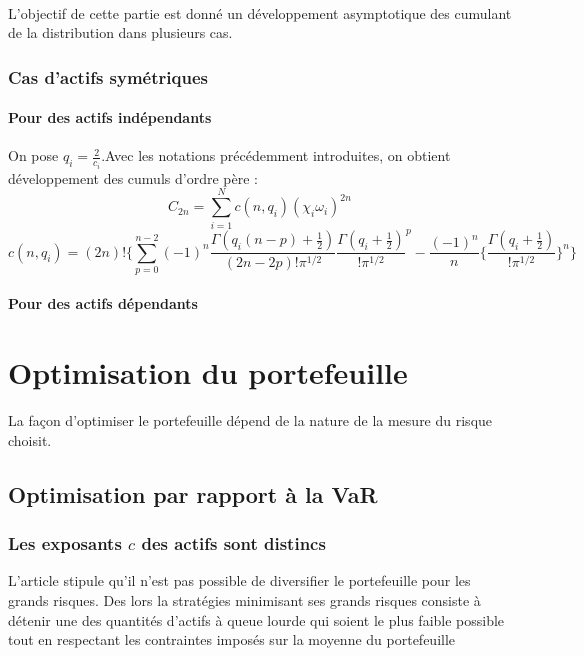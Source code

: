 \documentclass{article}
\begin{document}
     \paragraph{}
     L'objectif de cette partie est donné un développement asymptotique des cumulant de la distribution dans plusieurs cas.
     \subsubsection{Cas d'actifs symétriques}
     \paragraph{Pour des actifs indépendants}
     On pose $ q_{i}=\frac{2}{c_{i}}$.Avec les notations précédemment introduites, on obtient développement des cumuls d'ordre père :
     \begin{equation}
     C_{2n}=\sum_{i=1}^{N}c(n,q_{i})(\chi _{i}\omega _{i})^{2n}
     \end{equation}
     \begin{equation}
     c(n,q_{i})=(2n)!\lbrace \sum_{p=0}^{n-2}(-1)^{n}\frac{\Gamma (q_{i}(n-p)+\frac{1}{2})}{(2n-2p)!\pi ^{1/2}}{\frac{\Gamma (q_{i}+\frac{1}{2})}{!\pi ^{1/2}}}^{p}-\frac{(-1)^{n}}{n}\lbrace \frac{\Gamma (q_{i}+\frac{1}{2})}{!\pi ^{1/2}}\rbrace ^{n}\rbrace
     \end{equation}
      \paragraph{Pour des actifs dépendants}
      \section{ Optimisation du portefeuille}
      La façon d'optimiser le portefeuille dépend de la nature de la mesure du risque choisit.
      \subsection{Optimisation par rapport à la VaR}
      \subsubsection{Les exposants $c$ des actifs sont distincs}
       L'article stipule qu'il n'est pas possible de diversifier le portefeuille pour les grands risques. Des lors la stratégies minimisant ses grands risques consiste à détenir une des quantités d'actifs à queue lourde qui soient le plus faible possible tout en respectant les contraintes imposés sur la moyenne du portefeuille
\end{document}
